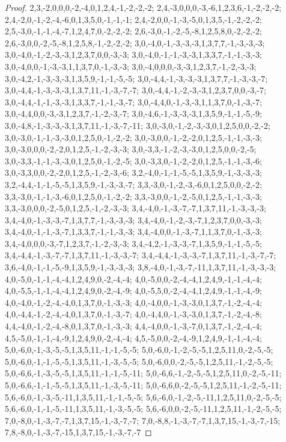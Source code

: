 \documentclass{article}
\begin{document}
\begin{proof}
{{2,3,-2,0,0,0,-2,-4,0,1,2,4,-1,-2,-2,-2; 2,4,-3,0,0,0,-3,-6,1,2,3,6,-1,-2,-2,-2; 2,4,-2,0,-1,-2,-4,-6,0,1,3,5,0,-1,-1,-1; 2,4,-2,0,0,-1,-3,-5,0,1,3,5,-1,-2,-2,-2; 2,5,-3,0,-1,-1,-4,-7,1,2,4,7,0,-2,-2,-2; 2,6,-3,0,-1,-2,-5,-8,1,2,5,8,0,-2,-2,-2; 2,6,-3,0,0,-2,-5,-8,1,2,5,8,-1,-2,-2,-2; 3,0,-4,0,-1,-3,-3,-3,1,3,7,7,-1,-3,-3,-3; 3,0,-4,0,-1,-2,-3,-3,1,2,3,7,0,0,-3,-3; 3,0,-4,0,-1,-1,-3,-3,1,3,3,7,-1,-1,-3,-3; 3,0,-4,0,0,-1,-3,-3,1,1,3,7,0,-1,-3,-3; 3,0,-4,0,0,0,-3,-3,1,2,3,7,-1,-2,-3,-3;
3,0,-4,2,-1,-3,-3,-3,1,3,5,9,-1,-1,-5,-5; 3,0,-4,4,-1,-3,-3,-3,1,3,7,7,-1,-3,-3,-7; 3,0,-4,4,-1,-3,-3,-3,1,3,7,11,-1,-3,-7,-7; 3,0,-4,4,-1,-2,-3,-3,1,2,3,7,0,0,-3,-7; 3,0,-4,4,-1,-1,-3,-3,1,3,3,7,-1,-1,-3,-7; 3,0,-4,4,0,-1,-3,-3,1,1,3,7,0,-1,-3,-7; 3,0,-4,4,0,0,-3,-3,1,2,3,7,-1,-2,-3,-7; 3,0,-4,6,-1,-3,-3,-3,1,3,5,9,-1,-1,-5,-9; 3,0,-4,8,-1,-3,-3,-3,1,3,7,11,-1,-3,-7,-11; 3,0,-3,0,-1,-2,-3,-3,0,1,2,5,0,0,-2,-2; 3,0,-3,0,-1,-1,-3,-3,0,1,2,5,0,-1,-2,-2; 3,0,-3,0,0,-1,-2,-2,0,1,2,5,-1,-1,-3,-3;
3,0,-3,0,0,0,-2,-2,0,1,2,5,-1,-2,-3,-3; 3,0,-3,3,-1,-2,-3,-3,0,1,2,5,0,0,-2,-5; 3,0,-3,3,-1,-1,-3,-3,0,1,2,5,0,-1,-2,-5; 3,0,-3,3,0,-1,-2,-2,0,1,2,5,-1,-1,-3,-6; 3,0,-3,3,0,0,-2,-2,0,1,2,5,-1,-2,-3,-6; 3,2,-4,0,-1,-1,-5,-5,1,3,5,9,-1,-3,-3,-3; 3,2,-4,4,-1,-1,-5,-5,1,3,5,9,-1,-3,-3,-7; 3,3,-3,0,-1,-2,-3,-6,0,1,2,5,0,0,-2,-2; 3,3,-3,0,-1,-1,-3,-6,0,1,2,5,0,-1,-2,-2; 3,3,-3,0,0,-1,-2,-5,0,1,2,5,-1,-1,-3,-3; 3,3,-3,0,0,0,-2,-5,0,1,2,5,-1,-2,-3,-3; 3,4,-4,0,-1,-3,-7,-7,1,3,7,11,-1,-3,-3,-3;
3,4,-4,0,-1,-3,-3,-7,1,3,7,7,-1,-3,-3,-3; 3,4,-4,0,-1,-2,-3,-7,1,2,3,7,0,0,-3,-3; 3,4,-4,0,-1,-1,-3,-7,1,3,3,7,-1,-1,-3,-3; 3,4,-4,0,0,-1,-3,-7,1,1,3,7,0,-1,-3,-3; 3,4,-4,0,0,0,-3,-7,1,2,3,7,-1,-2,-3,-3; 3,4,-4,2,-1,-3,-3,-7,1,3,5,9,-1,-1,-5,-5; 3,4,-4,4,-1,-3,-7,-7,1,3,7,11,-1,-3,-3,-7; 3,4,-4,4,-1,-3,-3,-7,1,3,7,11,-1,-3,-7,-7; 3,6,-4,0,-1,-1,-5,-9,1,3,5,9,-1,-3,-3,-3; 3,8,-4,0,-1,-3,-7,-11,1,3,7,11,-1,-3,-3,-3; 4,0,-5,0,-1,-1,-4,-4,1,2,4,9,0,-2,-4,-4; 4,0,-5,0,0,-2,-4,-4,1,2,4,9,-1,-1,-4,-4;
4,0,-5,5,-1,-1,-4,-4,1,2,4,9,0,-2,-4,-9; 4,0,-5,5,0,-2,-4,-4,1,2,4,9,-1,-1,-4,-9; 4,0,-4,0,-1,-2,-4,-4,0,1,3,7,0,-1,-3,-3; 4,0,-4,0,0,-1,-3,-3,0,1,3,7,-1,-2,-4,-4; 4,0,-4,4,-1,-2,-4,-4,0,1,3,7,0,-1,-3,-7; 4,0,-4,4,0,-1,-3,-3,0,1,3,7,-1,-2,-4,-8; 4,4,-4,0,-1,-2,-4,-8,0,1,3,7,0,-1,-3,-3; 4,4,-4,0,0,-1,-3,-7,0,1,3,7,-1,-2,-4,-4; 4,5,-5,0,-1,-1,-4,-9,1,2,4,9,0,-2,-4,-4; 4,5,-5,0,0,-2,-4,-9,1,2,4,9,-1,-1,-4,-4; 5,0,-6,0,-1,-3,-5,-5,1,3,5,11,-1,-1,-5,-5; 5,0,-6,0,-1,-2,-5,-5,1,2,5,11,0,-2,-5,-5;
5,0,-6,0,-1,-1,-5,-5,1,3,5,11,-1,-3,-5,-5; 5,0,-6,0,0,-2,-5,-5,1,2,5,11,-1,-2,-5,-5; 5,0,-6,6,-1,-3,-5,-5,1,3,5,11,-1,-1,-5,-11; 5,0,-6,6,-1,-2,-5,-5,1,2,5,11,0,-2,-5,-11; 5,0,-6,6,-1,-1,-5,-5,1,3,5,11,-1,-3,-5,-11; 5,0,-6,6,0,-2,-5,-5,1,2,5,11,-1,-2,-5,-11; 5,6,-6,0,-1,-3,-5,-11,1,3,5,11,-1,-1,-5,-5; 5,6,-6,0,-1,-2,-5,-11,1,2,5,11,0,-2,-5,-5; 5,6,-6,0,-1,-1,-5,-11,1,3,5,11,-1,-3,-5,-5; 5,6,-6,0,0,-2,-5,-11,1,2,5,11,-1,-2,-5,-5; 7,0,-8,0,-1,-3,-7,-7,1,3,7,15,-1,-3,-7,-7; 7,0,-8,8,-1,-3,-7,-7,1,3,7,15,-1,-3,-7,-15;
7,8,-8,0,-1,-3,-7,-15,1,3,7,15,-1,-3,-7,-7}\par
}


\end{proof}
\end{document}
